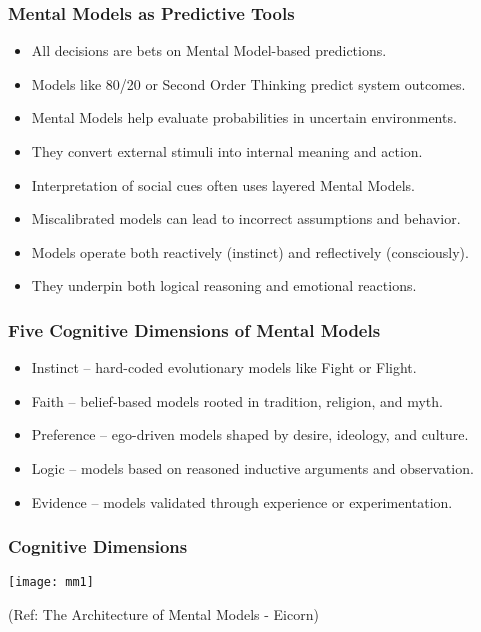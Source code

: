 \begin{frame}[fragile]\frametitle{Mental Models as Predictive Tools}
      \begin{itemize}
        \item All decisions are bets on Mental Model-based predictions.
        \item Models like 80/20 or Second Order Thinking predict system outcomes.
        \item Mental Models help evaluate probabilities in uncertain environments.
        \item They convert external stimuli into internal meaning and action.
        \item Interpretation of social cues often uses layered Mental Models.
        \item Miscalibrated models can lead to incorrect assumptions and behavior.
        \item Models operate both reactively (instinct) and reflectively (consciously).
        \item They underpin both logical reasoning and emotional reactions.
      \end{itemize}
\end{frame}

\begin{frame}[fragile]\frametitle{Five Cognitive Dimensions of Mental Models}
      \begin{itemize}
        \item Instinct – hard-coded evolutionary models like Fight or Flight.
        \item Faith – belief-based models rooted in tradition, religion, and myth.
        \item Preference – ego-driven models shaped by desire, ideology, and culture.
        \item Logic – models based on reasoned inductive arguments and observation.
        \item Evidence – models validated through experience or experimentation.
      \end{itemize}
\end{frame}

\begin{frame}[fragile]\frametitle{Cognitive Dimensions}
	
	\begin{center}
	\texttt{[image: mm1]}
	\end{center}
	
{\tiny (Ref: The Architecture of Mental Models - Eicorn)}

\end{frame}


